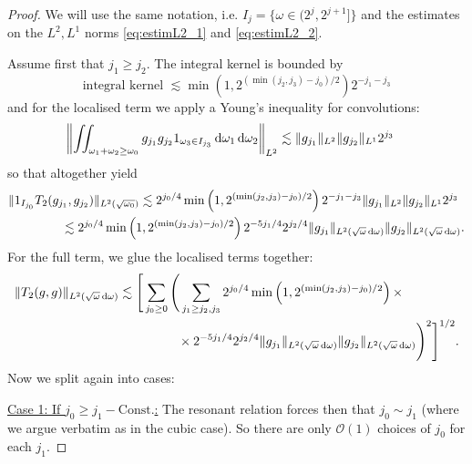 \documentclass[reqno,11pt,letterpaper]{amsart}
\numberwithin{equation}{section}
\newcommand{\dd}{\, {\rm d}}
\begin{document}
\begin{proof}
We will use the same notation, i.e. $I_j=\{\omega \in (2^j, 2^{j+1}]\}$ and the estimates on the $L^2, L^1$ norms \eqref{eq:estimL2_1} and \eqref{eq:estimL2_2}.

Assume first that $j_1\geq j_2$. The integral kernel is bounded by 
$$\text{integral kernel } \lesssim \min\left(1, 2^{(\min(j_2,j_3) - j_0)/2} \right) 2^{-j_1-j_3}$$ and for the localised term we apply a Young's inequality for convolutions: 
 \begin{align*}
     \left\| 
     \iint_{\omega_1+\omega_2\geq \omega_0}
     g_{j_1}g_{j_2} 1_{\omega_3 \in I_{j_3}} \dd \omega_1\dd\omega_2
     \right\|_{L^2} 
     &\lesssim \|g_{j_1}\|_{L^2} \|g_{j_2}\|_{L^1} 2^{j_3}
     \end{align*}
     so that altogether yield 
     \begin{align*}
         &\|1_{I_{j_0}} T_2(g_{j_1},g_{j_2})\|_{L^2(\sqrt{\omega_0})}  \lesssim 2^{j_0/4} \min\left(1, 2^{(\min(j_2,j_3) - j_0)/2} \right) 2^{-j_1-j_3}\|g_{j_1}\|_{L^2} \|g_{j_2}\|_{L^1} 2^{j_3}\\
         &\hskip 1.5cm \lesssim 
         2^{j_0/4} \min\left(1, 2^{(\min(j_2,j_3) - j_0)/2} \right) 2^{-5j_1/4}2^{j_2/4}\|g_{j_1}\|_{L^2(\sqrt{\omega}\dd\omega)} \|g_{j_2}\|_{L^2(\sqrt{\omega}\dd\omega)}. 
     \end{align*}
     For the full term, we glue the localised terms together: 
\begin{align*}
&\|T_2(g,g) \|_{L^2(\sqrt{\omega}\dd\omega)}\lesssim 
\Bigg[\sum_{j_0\geq 0} \Bigg( \sum_{j_1\geq j_2,j_3} 2^{j_0/4}\min\left(1, 2^{(\min(j_2,j_3) - j_0)/2} \right)\times  \\
& \hskip 4.5cm \times 2^{-5j_1/4}2^{j_2/4}\|g_{j_1}\|_{L^2(\sqrt{\omega}\dd\omega)} \|g_{j_2}\|_{L^2(\sqrt{\omega}\dd\omega)}  \Bigg)^2 \Bigg]^{1/2}.
\end{align*} 
 Now we split again into cases: 

      \noindent
        \underline{Case 1: If $j_0 \geq j_1 - \text{Const.}$:} The resonant relation forces then that $j_0 \sim j_1$ (where we argue verbatim as in the cubic case). So there are only $\mathcal{O}(1)$ choices of $j_0$ for each $j_1$. 


\end{proof}
\end{document}
